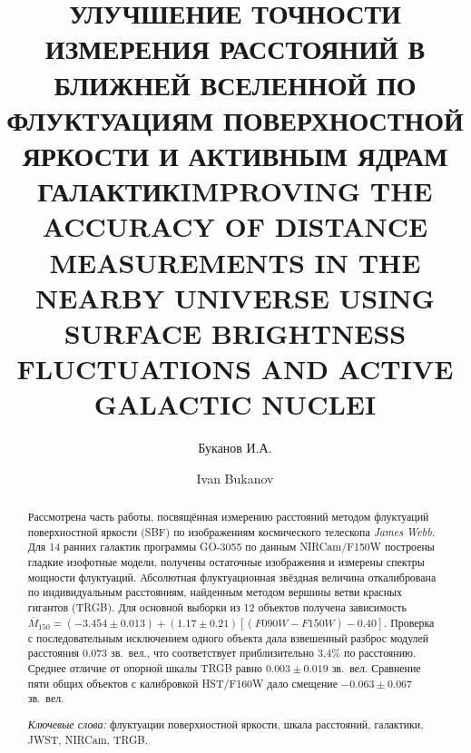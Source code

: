 \sloppy

\thispagestyle{empty}



\title{УЛУЧШЕНИЕ ТОЧНОСТИ ИЗМЕРЕНИЯ РАССТОЯНИЙ В БЛИЖНЕЙ ВСЕЛЕННОЙ ПО ФЛУКТУАЦИЯМ ПОВЕРХНОСТНОЙ ЯРКОСТИ И АКТИВНЫМ ЯДРАМ ГАЛАКТИК}

\author{Буканов И.\;А.}
\address{МГУ имени М.В.~Ломоносова (Россия, Москва)}

\begin{abstract}
Рассмотрена часть работы, посвящённая измерению расстояний методом флуктуаций поверхностной яркости (SBF) по изображениям космического телескопа \textit{James Webb}. Для 14 ранних галактик программы GO-3055 по данным NIRCam/F150W построены гладкие изофотные модели, получены остаточные изображения и измерены спектры мощности флуктуаций. Абсолютная флуктуационная звёздная величина откалибрована по индивидуальным расстояниям, найденным методом вершины ветви красных гигантов (TRGB). Для основной выборки из 12 объектов получена зависимость
$\overline M_{150}=(-3.454\pm0.013)+(1.17\pm0.21)[(F090W-F150W)-0.40]$.
Проверка с последовательным исключением одного объекта дала взвешенный разброс модулей расстояния $0.073$ зв.~вел., что соответствует приблизительно $3.4\%$ по расстоянию. Среднее отличие от опорной шкалы TRGB равно $0.003\pm0.019$ зв.~вел. Сравнение пяти общих объектов с калибровкой HST/F160W дало смещение $-0.063\pm0.067$ зв.~вел.

\emph{Ключевые слова:} флуктуации поверхностной яркости, шкала расстояний, галактики, JWST, NIRCam, TRGB.
\end{abstract}

\bigskip

\title{\uppercase{IMPROVING THE ACCURACY OF DISTANCE MEASUREMENTS IN THE NEARBY UNIVERSE USING SURFACE BRIGHTNESS FLUCTUATIONS AND ACTIVE GALACTIC NUCLEI}}
\author{Ivan Bukanov}
\address{Lomonosov Moscow State University (Russia, Moscow)}

